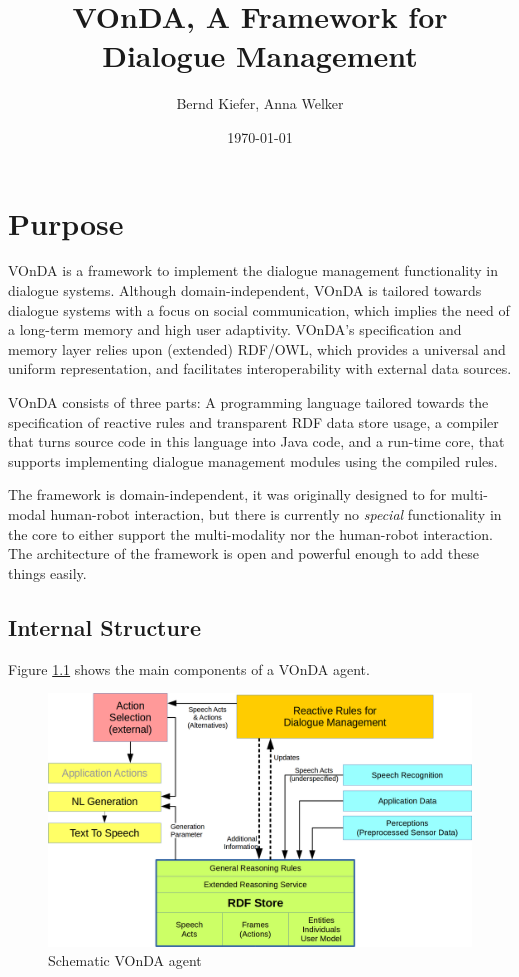 \documentclass[a4paper]{report}
\newcommand{\vonda}{VOnDA\xspace}
\begin{document}
\title{\vonda, A Framework for Dialogue Management}

\author{Bernd Kiefer, Anna Welker}
\date{\today}

\maketitle

\tableofcontents

\chapter{Purpose}

\vonda is a framework to implement the dialogue management functionality in
dialogue systems. Although domain-independent, \vonda is tailored towards
dialogue systems with a focus on social communication, which implies the need
of a long-term memory and high user adaptivity. \vonda's specification and
memory layer relies upon (extended) RDF/OWL, which provides a universal and
uniform representation, and facilitates interoperability with external data
sources.


\vonda consists of three parts: A programming language tailored towards the
specification of reactive rules and transparent RDF data store usage, a
compiler that turns source code in this language into Java code, and a run-time
core, that supports implementing dialogue management modules using the compiled
rules.

The framework is domain-independent, it was originally designed to for
multi-modal human-robot interaction, but there is currently no \emph{special}
functionality in the core to either support the multi-modality nor the
human-robot interaction. The architecture of the framework is open and powerful
enough to add these things easily.


\section{Internal Structure}

Figure \ref{fig:arch} shows the main components of a \vonda agent.


\begin{figure}[htb]
\includegraphics[width=.9\textwidth]{rudimant.png}
\caption{\label{fig:arch}Schematic \vonda agent}
\end{figure}
\end{document}
